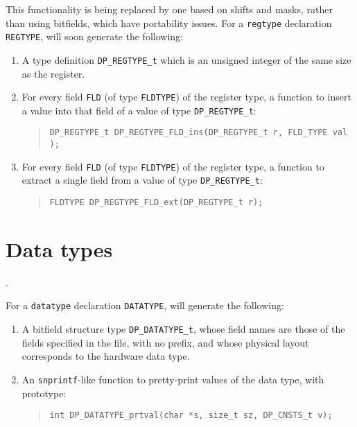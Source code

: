 \documentclass[a4paper,11pt,twoside]{report}
\begin{document}
This functionality is being replaced by one based on shifts and masks,
rather than using bitfields, which have portability issues. 
For a \texttt{regtype} declaration \texttt{REGTYPE}, \Mac will soon
generate the following: 

\begin{enumerate}

\item A type definition \texttt{DP\_REGTYPE\_t} which is an unsigned
  integer of the same size as the register. 

\item For every field \texttt{FLD} (of type \texttt{FLDTYPE}) of the
  register type, a function to insert a value into that field of a value
  of type \texttt{DP\_REGTYPE\_t}: 
  \begin{quote}
    \texttt{DP\_REGTYPE\_t DP\_REGTYPE\_FLD\_ins(DP\_REGTYPE\_t r, FLD\_TYPE val );}
  \end{quote}

\item For every field \texttt{FLD} (of type \texttt{FLDTYPE}) of the
  register type, a function to extract a single field from a value
  of type \texttt{DP\_REGTYPE\_t}: 
  \begin{quote}
    \texttt{FLDTYPE DP\_REGTYPE\_FLD\_ext(DP\_REGTYPE\_t r);}
  \end{quote}

\end{enumerate}

\section{Data types}\label{sec:old:c-datatype}. 

For a \texttt{datatype} declaration
\texttt{DATATYPE}, \Mac will generate the following:

\begin{enumerate}

\item A bitfield structure type \texttt{DP\_DATATYPE\_t}, whose field
  names are those of the fields specified in the \Mac file, with no
  prefix, and whose physical layout corresponds to the hardware data type.

\item An \texttt{snprintf}-like function to pretty-print values of the
  data type, with prototype:
  \begin{quote}
    \texttt{int DP\_DATATYPE\_prtval(char *s, size\_t sz, DP\_CNSTS\_t v);}
  \end{quote}

\end{enumerate}
\end{document}
